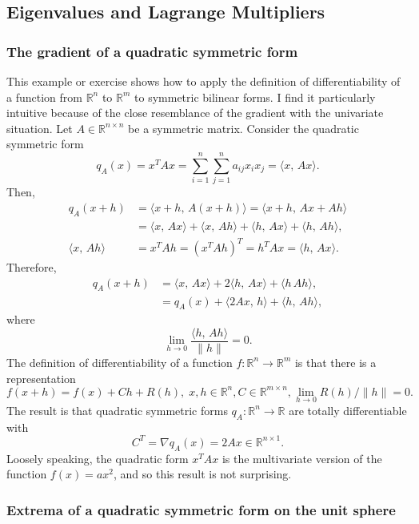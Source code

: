 \documentclass[graybox]{svmult}
\newcommand{\R}{\mathds{R}}
\begin{document}
\subsection{Eigenvalues and Lagrange Multipliers}

\subsubsection{The gradient of a quadratic symmetric form}
This example or exercise shows how to apply the definition of differentiability of a function from $\R^n$ to $\R^m$ to symmetric bilinear forms. I find it particularly intuitive because of the close resemblance of the gradient with the univariate situation.  Let $A\in\R^{n\times n}$ be a symmetric matrix. Consider the quadratic symmetric form
\[
q_A(x) = x^T A x = \sum_{i=1}^n\sum_{j=1}^n a_{ij} x_i x_j = \langle x,\, Ax \rangle.
\]
Then,
\begin{align*}
q_A(x+h) &= \langle x+h,\, A(x+h) \rangle = \langle x+h,\, Ax + Ah \rangle\\
 &= \langle x,\, Ax\rangle + \langle x,\, Ah\rangle + \langle h,\, Ax\rangle + \langle h,\, Ah\rangle,\\
\langle x,\, Ah\rangle &= x^T Ah = (x^T Ah)^T = h^T A x = \langle h,\, Ax\rangle .
\end{align*}
Therefore,
\begin{align*}
q_A(x+h) &= \langle x,\, Ax\rangle + 2\langle h,\, Ax\rangle + \langle h\, Ah\rangle,\\
 &= q_A(x) + \langle 2Ax,\, h\rangle + \langle h,\, Ah\rangle ,
\end{align*}
where
\[
\lim_{h \to 0}\frac{\langle h,\, Ah\rangle}{\| h\|} = 0.
\]
The definition of differentiability of a function $f:\R^n\to\R^m$ is that there is a representation
\[
f(x+h) = f(x) + Ch + R(h), \; x,h\in\R^n, C\in\R^{m\times n}, \lim_{h\to 0} R(h)/\|h\|=0.
\] 
The result is that quadratic symmetric forms $q_A: \R^n\to\R$ are totally differentiable with
\[
C^T = \nabla q_A(x) = 2 A x \in \R^{n\times 1}.
\]
Loosely speaking, the quadratic form $x^T A x$ is the multivariate version of the function $f(x)=ax^2$, and so this result is not surprising.

\subsubsection{Extrema of a quadratic symmetric form on the unit sphere}
\end{document}
